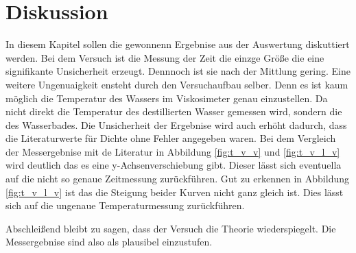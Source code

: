 \section{Diskussion}
In diesem Kapitel sollen die gewonnenn Ergebnise aus der Auswertung diskuttiert werden.
Bei dem Versuch ist die Messung der Zeit die einzge Größe die 
eine signifikante Unsicherheit erzeugt.
Dennnoch ist sie nach 
der Mittlung gering.
Eine weitere Ungenuaigkeit ensteht durch den Versuchaufbau selber.
Denn es ist kaum möglich die Temperatur des Wassers im Viskosimeter 
genau einzustellen. 
Da nicht direkt die Temperatur des destillierten Wasser gemessen wird, sondern die des Wasserbades.
Die Unsicherheit der Ergebnise wird auch erhöht dadurch, dass
die Literaturwerte für Dichte ohne Fehler angegeben waren.
Bei dem Vergleich der Messergebnise mit de Literatur in Abbildung \ref{fig:t_v_v} und \ref{fig:t_v_l_v} wird deutlich das es eine y-Achsenverschiebung gibt.
Dieser lässt sich eventuella auf die nicht so genaue Zeitmessung zurückführen.
Gut zu erkennen in Abbildung \ref{fig:t_v_l_v} ist das die Steigung beider 
Kurven nicht ganz gleich ist.
Dies lässt sich auf die ungenaue Temperaturmessung zurückführen.%

Abschleißend bleibt zu sagen, dass der Versuch die Theorie wiederspiegelt.
Die Messergebnise sind also als plausibel einzustufen.